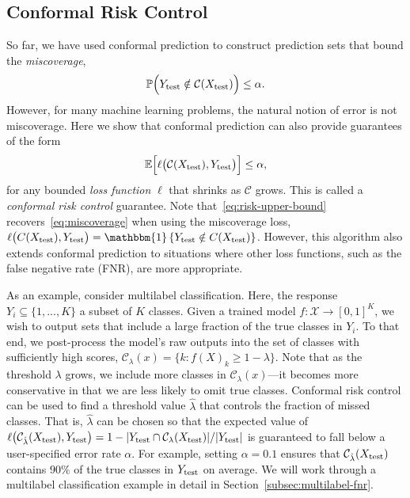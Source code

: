 \documentclass[10pt]{article}
\def\E{\mathbb{E}}
\newcommand{\X}{\mathcal{X}}
\newcommand{\C}{\mathcal{C}}
\newcommand{\lhat}{\hat{\lambda}}
\newcommand{\ind}[1]{\mathbbm{1}\left\{#1\right\}}
\renewcommand{\P}{\mathbb{P}}
\newcommand{\Clam}{\mathcal{C}_{\lambda}}
\newcommand{\Clamhat}{\mathcal{C}_{\hat{\lambda}}}
\begin{document}
\subsection{Conformal Risk Control}
\label{subsec:conformal-risk}
So far, we have used conformal prediction to construct prediction sets that bound the \emph{miscoverage},
\begin{equation}
    \label{eq:miscoverage}
    \P\Big( Y_{\rm test} \notin \C(X_{\rm test}) \Big) \leq \alpha.
\end{equation}
However, for many machine learning problems, the natural notion of error is not miscoverage.
Here we show that conformal prediction can also provide guarantees of the form
\begin{equation}
    \label{eq:risk-upper-bound}
    \E\Big[ \ell\big(\C(X_{\rm test}), Y_{\rm test}\big) \Big] \leq \alpha,
\end{equation}
for any bounded \emph{loss function} $\ell$ that shrinks as $\C$ grows.
This is called a \emph{conformal risk control} guarantee.
Note that~\eqref{eq:risk-upper-bound} recovers~\eqref{eq:miscoverage} when using the miscoverage loss, $\ell\big(C(X_{\rm test}),Y_{\rm test}\big) = \ind{Y_{\rm test} \notin C(X_{\rm test})}$.
However, this algorithm also  extends conformal prediction to situations where other loss functions, such as the false negative rate (FNR), are more appropriate.

As an example, consider multilabel classification. Here, the response $Y_i \subseteq \{1,...,K\}$ a subset of $K$ classes.
Given a trained model $f : \X \to [0,1]^K$, we wish to output sets that include a large fraction of the true classes in $Y_i$. 
To that end, we post-process the model's raw outputs into the set of classes with sufficiently high scores, $\Clam(x) = \{ k : f(X)_k \geq 1- \lambda \}$.
Note that as the threshold $\lambda$ grows, we include more classes in $\Clam(x)$---it becomes more conservative in that we are less likely to omit true classes.
Conformal risk control can be used to find a threshold value $\lhat$ that controls the fraction of missed classes. That is, $\lhat$ can be chosen so that the expected value of $\ell\big( \Clamhat(X_{\rm test}), Y_{\rm test} \big) = 1 - |Y_{\rm test} \cap \Clam(X_{\rm test})|/ |Y_{\rm test}|$ is guaranteed to fall below a user-specified error rate $\alpha$.
For example, setting $\alpha=0.1$ ensures that $\Clamhat(X_{\rm test})$ contains $90\%$ of the true classes in $Y_{\rm test}$ on average. We will work through a multilabel classification example in detail in Section~\ref{subsec:multilabel-fnr}.
\end{document}
